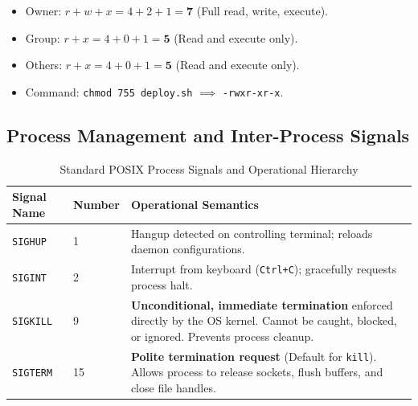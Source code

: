 \begin{keyconcept}
\begin{itemize}[leftmargin=*]
    \item Owner: $r + w + x = 4 + 2 + 1 = \mathbf{7}$ (Full read, write, execute).
    \item Group: $r + x = 4 + 0 + 1 = \mathbf{5}$ (Read and execute only).
    \item Others: $r + x = 4 + 0 + 1 = \mathbf{5}$ (Read and execute only).
    \item Command: \texttt{chmod 755 deploy.sh} $\implies$ \texttt{-rwxr-xr-x}.
\end{itemize}
\end{keyconcept}

\subsection{Process Management and Inter-Process Signals}
\begin{table}[htbp]
\centering
\small
\begin{tabularx}{\textwidth}{l l X}
\toprule
\textbf{Signal Name} & \textbf{Number} & \textbf{Operational Semantics} \\
\midrule
\texttt{SIGHUP} & 1 & Hangup detected on controlling terminal; reloads daemon configurations. \\
\texttt{SIGINT} & 2 & Interrupt from keyboard (\texttt{Ctrl+C}); gracefully requests process halt. \\
\texttt{SIGKILL} & 9 & \textbf{Unconditional, immediate termination} enforced directly by the OS kernel. Cannot be caught, blocked, or ignored. Prevents process cleanup. \\
\texttt{SIGTERM} & 15 & \textbf{Polite termination request} (Default for \texttt{kill}). Allows process to release sockets, flush buffers, and close file handles. \\
\bottomrule
\end{tabularx}
\caption{Standard POSIX Process Signals and Operational Hierarchy}
\label{tab:posix_signals}
\end{table}

